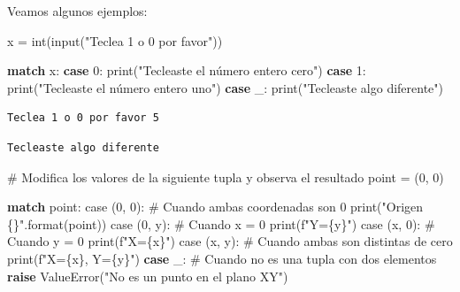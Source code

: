 \documentclass[
  spanish,
  letterpaper,
]{scrbook}
\newenvironment{Shaded}{\begin{snugshade}}{\end{snugshade}}
\newcommand{\BuiltInTok}[1]{\textcolor[rgb]{0.00,0.23,0.31}{#1}}
\newcommand{\CommentTok}[1]{\textcolor[rgb]{0.37,0.37,0.37}{#1}}
\newcommand{\ControlFlowTok}[1]{\textcolor[rgb]{0.00,0.23,0.31}{\textbf{#1}}}
\newcommand{\DecValTok}[1]{\textcolor[rgb]{0.68,0.00,0.00}{#1}}
\newcommand{\NormalTok}[1]{\textcolor[rgb]{0.00,0.23,0.31}{#1}}
\newcommand{\OperatorTok}[1]{\textcolor[rgb]{0.37,0.37,0.37}{#1}}
\newcommand{\PreprocessorTok}[1]{\textcolor[rgb]{0.68,0.00,0.00}{#1}}
\newcommand{\SpecialCharTok}[1]{\textcolor[rgb]{0.37,0.37,0.37}{#1}}
\newcommand{\SpecialStringTok}[1]{\textcolor[rgb]{0.13,0.47,0.30}{#1}}
\newcommand{\StringTok}[1]{\textcolor[rgb]{0.13,0.47,0.30}{#1}}
\theoremstyle{definition}
\theoremstyle{remark}
\begin{document}
Veamos algunos ejemplos:

\begin{Shaded}
\begin{Highlighting}[]
\NormalTok{x }\OperatorTok{=} \BuiltInTok{int}\NormalTok{(}\BuiltInTok{input}\NormalTok{(}\StringTok{"Teclea 1 o 0 por favor"}\NormalTok{))}

\ControlFlowTok{match}\NormalTok{ x:}
    \ControlFlowTok{case} \DecValTok{0}\NormalTok{:}
        \BuiltInTok{print}\NormalTok{(}\StringTok{"Tecleaste el número entero cero"}\NormalTok{)}
    \ControlFlowTok{case} \DecValTok{1}\NormalTok{:}
        \BuiltInTok{print}\NormalTok{(}\StringTok{"Tecleaste el número entero uno"}\NormalTok{)}
    \ControlFlowTok{case}\NormalTok{ \_:}
        \BuiltInTok{print}\NormalTok{(}\StringTok{"Tecleaste algo diferente"}\NormalTok{)}
        
\end{Highlighting}
\end{Shaded}

\begin{verbatim}
Teclea 1 o 0 por favor 5
\end{verbatim}

\begin{verbatim}
Tecleaste algo diferente
\end{verbatim}

\begin{Shaded}
\begin{Highlighting}[]
\CommentTok{\# Modifica los valores de la siguiente tupla y observa el resultado}
\NormalTok{point }\OperatorTok{=}\NormalTok{ (}\DecValTok{0}\NormalTok{, }\DecValTok{0}\NormalTok{)}

\ControlFlowTok{match}\NormalTok{ point:}
\NormalTok{    case (}\DecValTok{0}\NormalTok{, }\DecValTok{0}\NormalTok{): }\CommentTok{\# Cuando ambas coordenadas son 0}
        \BuiltInTok{print}\NormalTok{(}\StringTok{"Origen }\SpecialCharTok{\{\}}\StringTok{"}\NormalTok{.}\BuiltInTok{format}\NormalTok{(point))}
\NormalTok{    case (}\DecValTok{0}\NormalTok{, y): }\CommentTok{\# Cuando x = 0}
        \BuiltInTok{print}\NormalTok{(}\SpecialStringTok{f"Y=}\SpecialCharTok{\{}\NormalTok{y}\SpecialCharTok{\}}\SpecialStringTok{"}\NormalTok{)}
\NormalTok{    case (x, }\DecValTok{0}\NormalTok{): }\CommentTok{\# Cuando y = 0}
        \BuiltInTok{print}\NormalTok{(}\SpecialStringTok{f"X=}\SpecialCharTok{\{}\NormalTok{x}\SpecialCharTok{\}}\SpecialStringTok{"}\NormalTok{)}
\NormalTok{    case (x, y): }\CommentTok{\# Cuando ambas son distintas de cero}
        \BuiltInTok{print}\NormalTok{(}\SpecialStringTok{f"X=}\SpecialCharTok{\{}\NormalTok{x}\SpecialCharTok{\}}\SpecialStringTok{, Y=}\SpecialCharTok{\{}\NormalTok{y}\SpecialCharTok{\}}\SpecialStringTok{"}\NormalTok{)}
    \ControlFlowTok{case}\NormalTok{ \_: }\CommentTok{\# Cuando no es una tupla con dos elementos}
        \ControlFlowTok{raise} \PreprocessorTok{ValueError}\NormalTok{(}\StringTok{"No es un punto en el plano XY"}\NormalTok{)}
\end{Highlighting}
\end{Shaded}
\end{document}
